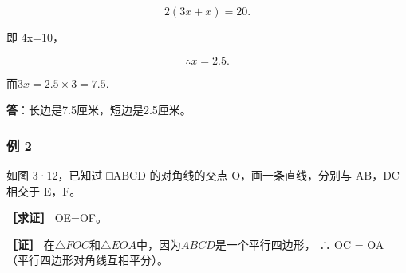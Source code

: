 \[
2 (3 x + x) = 20.
\]

即 4x=10，

\[
\therefore x = 2.5.
\]

而\(3x = 2.5 \times 3 = 7.5.\)

\textbf{答}：长边是7.5厘米，短边是2.5厘米。

\subsubsection{例 2}

如图 3·12，已知过 □ABCD 的对角线的交点 O，画一条直线，分别与 AB，DC
相交于 E，F。

\textbf{［求证］} OE=OF。

\textbf{［证］}
在\(\triangle FOC\)和\(\triangle EOA\)中，因为\(ABCD\)是一个平行四边形，
∴ OC = OA （平行四边形对角线互相平分）。

